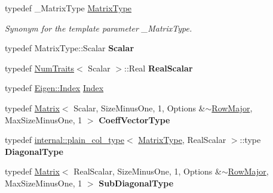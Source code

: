 \begin{DoxyCompactItemize}
\mbox{\label{group___eigenvalues___module_add0f4b2216d0ea8ee0f7d8525deaf0a9}} 
typedef \+\_\+\+Matrix\+Type \hyperlink{group___eigenvalues___module_add0f4b2216d0ea8ee0f7d8525deaf0a9}{Matrix\+Type}
\begin{DoxyCompactList}\small\item\em Synonym for the template parameter {\ttfamily \+\_\+\+Matrix\+Type}. \end{DoxyCompactList}\item 
\mbox{\label{group___eigenvalues___module_af3f9d8d46f2a1663013e207ff568b5f9}} 
typedef Matrix\+Type\+::\+Scalar {\bfseries Scalar}
\item 
\mbox{\label{group___eigenvalues___module_a9d33e4c11dad35a8b147cbe048974700}} 
typedef \hyperlink{group___core___module_struct_eigen_1_1_num_traits}{Num\+Traits}$<$ Scalar $>$\+::Real {\bfseries Real\+Scalar}
\item 
typedef \hyperlink{namespace_eigen_a62e77e0933482dafde8fe197d9a2cfde}{Eigen\+::\+Index} \hyperlink{group___eigenvalues___module_a7bd1f9fccec1e93b77a2214b2d30aae9}{Index}
\item 
\mbox{\label{group___eigenvalues___module_ad8891a972b6b5c5588dc4109597d6b58}} 
typedef \hyperlink{group___core___module_class_eigen_1_1_matrix}{Matrix}$<$ Scalar, Size\+Minus\+One, 1, Options \&$\sim$\hyperlink{group__enums_ggaacded1a18ae58b0f554751f6cdf9eb13acfcde9cd8677c5f7caf6bd603666aae3}{Row\+Major}, Max\+Size\+Minus\+One, 1 $>$ {\bfseries Coeff\+Vector\+Type}
\item 
\mbox{\label{group___eigenvalues___module_aac5303dbff6921f9a1b9dad0cacfe00c}} 
typedef \hyperlink{struct_eigen_1_1internal_1_1plain__col__type}{internal\+::plain\+\_\+col\+\_\+type}$<$ \hyperlink{group___eigenvalues___module_add0f4b2216d0ea8ee0f7d8525deaf0a9}{Matrix\+Type}, Real\+Scalar $>$\+::type {\bfseries Diagonal\+Type}
\item 
\mbox{\label{group___eigenvalues___module_a68729d89d61edbae954fc7ad0b72a5b8}} 
typedef \hyperlink{group___core___module_class_eigen_1_1_matrix}{Matrix}$<$ Real\+Scalar, Size\+Minus\+One, 1, Options \&$\sim$\hyperlink{group__enums_ggaacded1a18ae58b0f554751f6cdf9eb13acfcde9cd8677c5f7caf6bd603666aae3}{Row\+Major}, Max\+Size\+Minus\+One, 1 $>$ {\bfseries Sub\+Diagonal\+Type}

\end{DoxyCompactItemize}
